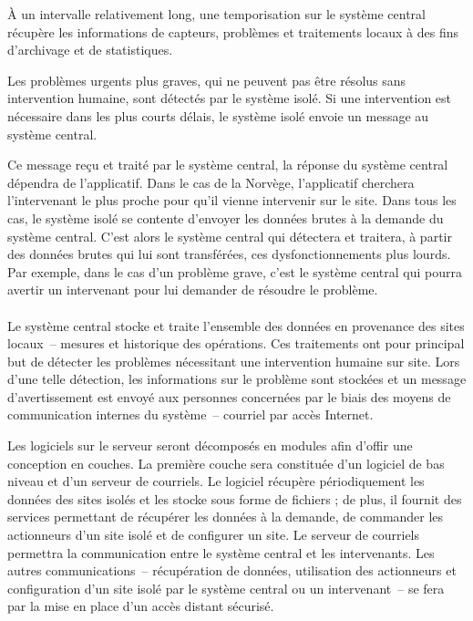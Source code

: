 \documentclass[a4paper, 11pt, final]{article}
\begin{document}
À un intervalle relativement long, une temporisation sur le système
central récupère les informations de capteurs, problèmes et
traitements locaux à des fins d'archivage et de statistiques.

Les problèmes urgents plus graves, qui ne peuvent pas être résolus
sans intervention humaine, sont détectés par le système isolé. Si une
intervention est nécessaire dans les plus courts délais, le système
isolé envoie un message au système central.

Ce message reçu et traité par le système central, la réponse du système central
dépendra de l'applicatif. Dans le cas de la Norvège, l'applicatif cherchera
l'intervenant le plus proche pour qu'il vienne intervenir sur le site.
Dans tous les cas, le système isolé se contente d'envoyer les données brutes
à la demande du système central. C'est alors le système central qui
détectera et traitera, à partir des données brutes qui lui sont
transférées, ces dysfonctionnements plus lourds. Par exemple, dans
le cas d'un problème grave, c'est le système central qui pourra
avertir un intervenant pour lui demander de résoudre le problème.

\paragraph{}
Le système central stocke et traite l'ensemble des données en
provenance des sites locaux~-- mesures et historique des
opérations. Ces traitements ont pour principal but de détecter les
problèmes nécessitant une intervention humaine sur site. Lors d'une
telle détection, les informations sur le problème sont stockées et un
message d'avertissement est envoyé aux personnes concernées par le
biais des moyens de communication internes du système~-- courriel par
accès Internet.

Les logiciels sur le serveur seront décomposés en modules afin d'offir
une conception en couches. La première couche sera constituée d'un
logiciel de bas niveau et d'un serveur de courriels. Le logiciel
récupère périodiquement les données des sites isolés et les stocke
sous forme de fichiers ; de plus, il fournit des services permettant
de récupérer les données à la demande, de commander les actionneurs
d'un site isolé et de configurer un site. Le serveur de courriels
permettra la communication entre le système central et les
intervenants. Les autres communications~-- récupération de données,
utilisation des actionneurs et configuration d'un site isolé par le
système central ou un intervenant~-- se fera par la mise en place d'un
accès distant sécurisé.
\end{document}
